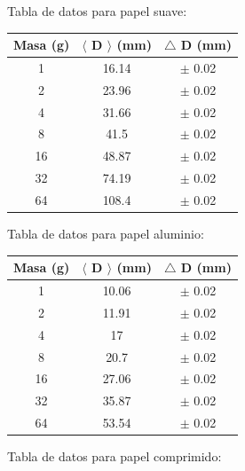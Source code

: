 \documentclass[11pt, a4paper, twocolumn]{article}
\begin{document}
Tabla de datos para papel suave:

\begin{tabular}{ccc}
\hline
   Masa (g) &   $\langle$ D $\rangle$ (mm) & $\bigtriangleup$ D (mm)   \\
\hline
          1 &                        16.14 & $\pm$ 0.02                 \\
          2 &                        23.96 & $\pm$ 0.02                 \\
          4 &                        31.66 & $\pm$ 0.02                 \\
          8 &                        41.5  & $\pm$ 0.02                 \\
         16 &                        48.87 & $\pm$ 0.02                 \\
         32 &                        74.19 & $\pm$ 0.02                 \\
         64 &                       108.4  & $\pm$ 0.02                 \\
\hline
\end{tabular}


\vspace{0.5cm}


Tabla de datos para papel aluminio:

\begin{tabular}{ccc}
\hline
   Masa (g) &   $\langle$ D $\rangle$ (mm) & $\bigtriangleup$ D (mm)   \\
\hline
          1 &                        10.06 & $\pm$ 0.02                 \\
          2 &                        11.91 & $\pm$ 0.02                 \\
          4 &                        17    & $\pm$ 0.02                 \\
          8 &                        20.7  & $\pm$ 0.02                 \\
         16 &                        27.06 & $\pm$ 0.02                 \\
         32 &                        35.87 & $\pm$ 0.02                 \\
         64 &                        53.54 & $\pm$ 0.02                 \\
\hline
\end{tabular}


\vspace{0.5cm}


Tabla de datos para papel comprimido:
\end{document}
